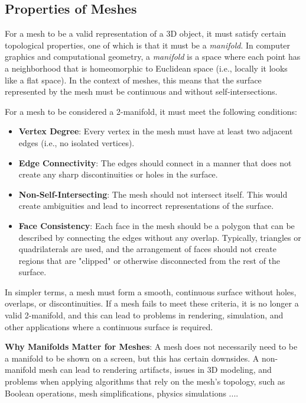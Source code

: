 \subsection{Properties of Meshes}

For a mesh to be a valid representation of a 3D object, it must satisfy certain topological properties, one of which is that it must be a \textit{manifold}. In computer graphics and computational geometry, a \textit{manifold} is a space where each point has a neighborhood that is homeomorphic to Euclidean space (i.e., locally it looks like a flat space). In the context of meshes, this means that the surface represented by the mesh must be continuous and without self-intersections.

For a mesh to be considered a 2-manifold, it must meet the following conditions:

\begin{itemize}
    \item \textbf{Vertex Degree}: Every vertex in the mesh must have at least two adjacent edges (i.e., no isolated vertices).
    
    \item \textbf{Edge Connectivity}: The edges should connect in a manner that does not create any sharp discontinuities or holes in the surface.
    
    \item \textbf{Non-Self-Intersecting}: The mesh should not intersect itself. This would create ambiguities and lead to incorrect representations of the surface.
    
    \item \textbf{Face Consistency}: Each face in the mesh should be a polygon that can be described by connecting the edges without any overlap. Typically, triangles or quadrilaterals are used, and the arrangement of faces should not create regions that are "clipped" or otherwise disconnected from the rest of the surface.
\end{itemize}

In simpler terms, a mesh must form a smooth, continuous surface without holes, overlaps, or discontinuities. If a mesh fails to meet these criteria, it is no longer a valid 2-manifold, and this can lead to problems in rendering, simulation, and other applications where a continuous surface is required.

\textbf{Why Manifolds Matter for Meshes}:  
A mesh does not necessarily need to be a manifold to be shown on a screen, but this has certain downsides. A non-manifold mesh can lead to rendering artifacts, issues in 3D modeling, and problems when applying algorithms that rely on the mesh's topology, such as Boolean operations, mesh simplifications, physics simulations ....










